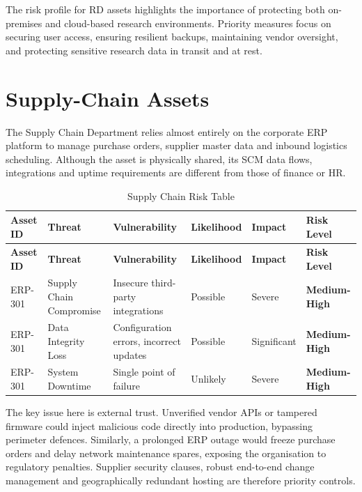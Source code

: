The risk profile for \ac{RD} assets highlights the importance of protecting both on-premises and cloud-based research environments.
Priority measures focus on securing user access, ensuring resilient backups, maintaining vendor oversight, and protecting sensitive research data in transit and at rest.

\section{Supply-Chain Assets}

The Supply Chain Department relies almost entirely on the corporate \ac{ERP} platform to manage purchase orders, supplier master data and inbound logistics scheduling.
Although the asset is physically shared, its \ac{SCM} data flows, integrations and uptime requirements are different from those of finance or \ac{HR}.

\begin{longtable}{|p{2cm}|p{2.5cm}|p{3cm}|p{2cm}|p{2cm}|p{2cm}|}
  \caption{Supply Chain Risk Table}
  \label{tab:supply_chain_risks}                                                                                                                       \\
  \hline
  \textbf{Asset ID} & \textbf{Threat}         & \textbf{Vulnerability}                  & \textbf{Likelihood} & \textbf{Impact} & \textbf{Risk Level}  \\
  \hline
  \endfirsthead

  \hline
  \textbf{Asset ID} & \textbf{Threat}         & \textbf{Vulnerability}                  & \textbf{Likelihood} & \textbf{Impact} & \textbf{Risk Level}  \\
  \hline
  \endhead

  \hline
  \endfoot

  ERP-301           & Supply Chain Compromise & Insecure third-party integrations       & Possible            & Severe          & \textbf{Medium-High} \\
  \hline
  ERP-301           & Data Integrity Loss     & Configuration errors, incorrect updates & Possible            & Significant     & \textbf{Medium-High} \\
  \hline
  ERP-301           & System Downtime         & Single point of failure                 & Unlikely            & Severe          & \textbf{Medium-High} \\
  \hline
\end{longtable}

The key issue here is external trust. Unverified vendor \ac{API}s or tampered firmware could inject malicious code directly into production, bypassing perimeter defences.
Similarly, a prolonged \ac{ERP} outage would freeze purchase orders and delay network maintenance spares, exposing the organisation to regulatory penalties.
Supplier security clauses, robust end-to-end change management and geographically redundant hosting are therefore priority controls.

